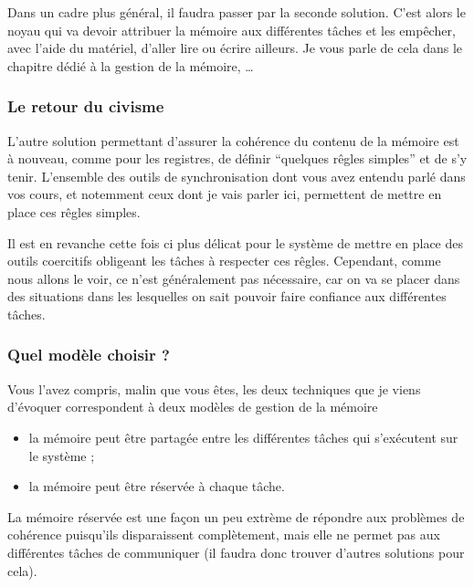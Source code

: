    Dans un cadre plus général, il faudra passer par la seconde
solution. C'est alors le noyau qui va devoir attribuer la mémoire aux
différentes tâches et les empêcher, avec l'aide du matériel, d'aller
lire ou écrire ailleurs. Je vous parle de cela dans le chapitre dédié
à la gestion de la mémoire, \ldots

%
\subsubsection{Le retour du civisme}

   L'autre solution permettant d'assurer la cohérence du contenu de la
mémoire est à nouveau, comme pour les registres, de définir ``quelques
rêgles simples'' et de s'y tenir. L'ensemble des outils de
synchronisation dont vous avez entendu parlé dans vos cours, et
notemment ceux dont je vais parler ici, permettent de mettre en place
ces rêgles simples.

   Il est en revanche cette fois ci plus délicat pour le système de
mettre en place des outils coercitifs obligeant les tâches à
respecter ces rêgles. Cependant, comme nous allons le voir, ce n'est
généralement pas nécessaire, car on va se placer dans des situations
dans les lesquelles on sait pouvoir faire confiance aux différentes
tâches.

%
\subsubsection{Quel modèle choisir ?}

   Vous l'avez compris, malin que vous êtes, les deux techniques que
je viens d'évoquer correspondent à deux modèles de gestion de la
mémoire

\begin{itemize}
   \item la mémoire peut être partagée entre les différentes tâches
   qui s'exécutent sur le système ;
   \item la mémoire peut être réservée à chaque tâche.
\end{itemize}

   La mémoire réservée est une façon un peu extrème de répondre aux
problèmes de cohérence puisqu'ils disparaissent complètement, mais
elle ne permet pas aux différentes tâches de communiquer (il faudra
donc trouver d'autres solutions pour cela).

